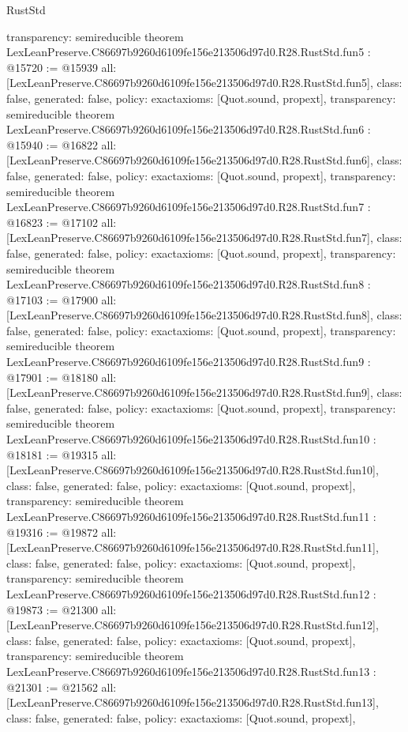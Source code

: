 \begin{lexlean}{RustStd}
\begin{coremodule}
{  transparency: semireducible
}
theorem LexLeanPreserve.C86697b9260d6109fe156e213506d97d0.R28.RustStd.fun5 : @15720 := @15939 {
  all: [LexLeanPreserve.C86697b9260d6109fe156e213506d97d0.R28.RustStd.fun5],
  class: false,
  generated: false,
  policy: exact{axioms: [Quot.sound, propext]},
  transparency: semireducible
}
theorem LexLeanPreserve.C86697b9260d6109fe156e213506d97d0.R28.RustStd.fun6 : @15940 := @16822 {
  all: [LexLeanPreserve.C86697b9260d6109fe156e213506d97d0.R28.RustStd.fun6],
  class: false,
  generated: false,
  policy: exact{axioms: [Quot.sound, propext]},
  transparency: semireducible
}
theorem LexLeanPreserve.C86697b9260d6109fe156e213506d97d0.R28.RustStd.fun7 : @16823 := @17102 {
  all: [LexLeanPreserve.C86697b9260d6109fe156e213506d97d0.R28.RustStd.fun7],
  class: false,
  generated: false,
  policy: exact{axioms: [Quot.sound, propext]},
  transparency: semireducible
}
theorem LexLeanPreserve.C86697b9260d6109fe156e213506d97d0.R28.RustStd.fun8 : @17103 := @17900 {
  all: [LexLeanPreserve.C86697b9260d6109fe156e213506d97d0.R28.RustStd.fun8],
  class: false,
  generated: false,
  policy: exact{axioms: [Quot.sound, propext]},
  transparency: semireducible
}
theorem LexLeanPreserve.C86697b9260d6109fe156e213506d97d0.R28.RustStd.fun9 : @17901 := @18180 {
  all: [LexLeanPreserve.C86697b9260d6109fe156e213506d97d0.R28.RustStd.fun9],
  class: false,
  generated: false,
  policy: exact{axioms: [Quot.sound, propext]},
  transparency: semireducible
}
theorem LexLeanPreserve.C86697b9260d6109fe156e213506d97d0.R28.RustStd.fun10 : @18181 := @19315 {
  all: [LexLeanPreserve.C86697b9260d6109fe156e213506d97d0.R28.RustStd.fun10],
  class: false,
  generated: false,
  policy: exact{axioms: [Quot.sound, propext]},
  transparency: semireducible
}
theorem LexLeanPreserve.C86697b9260d6109fe156e213506d97d0.R28.RustStd.fun11 : @19316 := @19872 {
  all: [LexLeanPreserve.C86697b9260d6109fe156e213506d97d0.R28.RustStd.fun11],
  class: false,
  generated: false,
  policy: exact{axioms: [Quot.sound, propext]},
  transparency: semireducible
}
theorem LexLeanPreserve.C86697b9260d6109fe156e213506d97d0.R28.RustStd.fun12 : @19873 := @21300 {
  all: [LexLeanPreserve.C86697b9260d6109fe156e213506d97d0.R28.RustStd.fun12],
  class: false,
  generated: false,
  policy: exact{axioms: [Quot.sound, propext]},
  transparency: semireducible
}
theorem LexLeanPreserve.C86697b9260d6109fe156e213506d97d0.R28.RustStd.fun13 : @21301 := @21562 {
  all: [LexLeanPreserve.C86697b9260d6109fe156e213506d97d0.R28.RustStd.fun13],
  class: false,
  generated: false,
  policy: exact{axioms: [Quot.sound, propext]},
}
\end{coremodule}
\end{lexlean}
